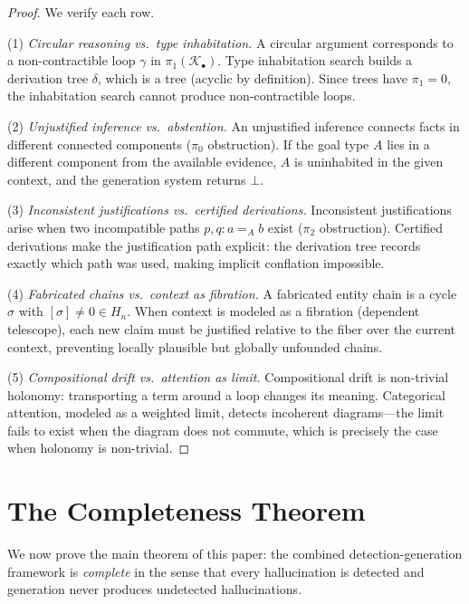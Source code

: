 \documentclass[11pt,a4paper]{article}
\theoremstyle{plain}
\theoremstyle{definition}
\theoremstyle{remark}
\begin{document}
\begin{proof}
We verify each row.

(1) \emph{Circular reasoning vs.\ type inhabitation.} A circular argument corresponds to a non-contractible loop $\gamma$ in $\pi_1(\mathcal{K}_\bullet)$. Type inhabitation search builds a derivation tree $\delta$, which is a tree (acyclic by definition). Since trees have $\pi_1 = 0$, the inhabitation search cannot produce non-contractible loops.

(2) \emph{Unjustified inference vs.\ abstention.} An unjustified inference connects facts in different connected components ($\pi_0$ obstruction). If the goal type $A$ lies in a different component from the available evidence, $A$ is uninhabited in the given context, and the generation system returns $\bot$.

(3) \emph{Inconsistent justifications vs.\ certified derivations.} Inconsistent justifications arise when two incompatible paths $p, q : a =_A b$ exist ($\pi_2$ obstruction). Certified derivations make the justification path explicit: the derivation tree records exactly which path was used, making implicit conflation impossible.

(4) \emph{Fabricated chains vs.\ context as fibration.} A fabricated entity chain is a cycle $\sigma$ with $[\sigma] \neq 0 \in H_n$. When context is modeled as a fibration (dependent telescope), each new claim must be justified relative to the fiber over the current context, preventing locally plausible but globally unfounded chains.

(5) \emph{Compositional drift vs.\ attention as limit.} Compositional drift is non-trivial holonomy: transporting a term around a loop changes its meaning. Categorical attention, modeled as a weighted limit, detects incoherent diagrams---the limit fails to exist when the diagram does not commute, which is precisely the case when holonomy is non-trivial.
\end{proof}


\section{The Completeness Theorem}\label{sec:completeness}

We now prove the main theorem of this paper: the combined detection-generation framework is \emph{complete} in the sense that every hallucination is detected and generation never produces undetected hallucinations.
\end{document}
